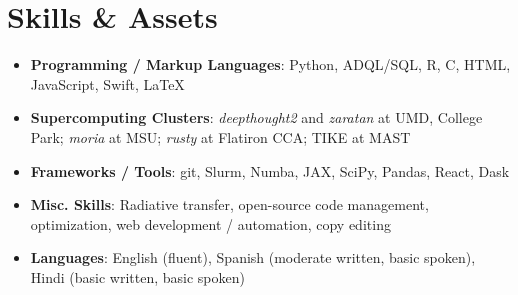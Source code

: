 \documentclass[letterpaper,10.5pt]{article}
\newcommand{\resumeSubHeadingListStart}{\begin{itemize}[leftmargin=*]}
\newcommand{\resumeSubHeadingListEnd}{\end{itemize}}
\newcommand{\shorterSection}[1]{\vspace{-10pt}\section{#1}}
\begin{document}
\shorterSection{Skills \& Assets}
  \resumeSubHeadingListStart
  \small
    \item{
     \textbf{Programming / Markup Languages}{: Python, ADQL/SQL, R, C, HTML, JavaScript, Swift, \LaTeX}
    }
    \vspace{-5pt}
    \item{
     \textbf{Supercomputing Clusters}{: \textit{deepthought2} and \textit{zaratan} at UMD, College Park; \textit{moria} at MSU; \textit{rusty} at Flatiron CCA; TIKE at MAST}
    }
    \vspace{-5pt}
    \item{
     \textbf{Frameworks / Tools}{: git, Slurm, Numba, JAX, SciPy, Pandas, React, Dask}
    }
    \vspace{-5pt}
    \item{
     \textbf{Misc. Skills}{: Radiative transfer, open-source code management, optimization, web development / automation, copy editing}
    }
    \vspace{-5pt}
    \item{
     \textbf{Languages}{: English (fluent), Spanish (moderate written, basic spoken), Hindi (basic written, basic spoken)}
    }
\resumeSubHeadingListEnd
\end{document}
